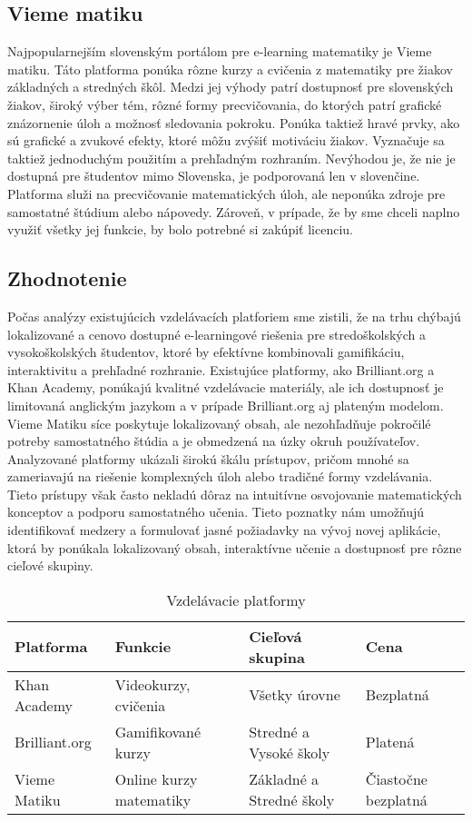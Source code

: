 \subsection{Vieme matiku}
Najpopularnejším slovenským portálom pre e-learning matematiky je Vieme matiku.
Táto platforma ponúka rôzne kurzy a cvičenia z matematiky pre žiakov základných a stredných škôl.
Medzi jej výhody patrí dostupnosť pre slovenských žiakov, široký výber tém, rôzné formy precvičovania,
do ktorých patrí grafické znázornenie úloh a možnosť sledovania pokroku.
Ponúka taktiež hravé prvky, ako sú grafické a zvukové efekty, ktoré môžu zvýšiť motiváciu žiakov.
Vyznačuje sa taktiež jednoduchým použitím a prehľadným rozhraním.
Nevýhodou je, že nie je dostupná pre študentov mimo Slovenska, je podporovaná len v slovenčine.
Platforma služi na precvičovanie matematických úloh, ale neponúka zdroje pre samostatné štúdium alebo nápovedy. 
Zároveň, v prípade, že by sme chceli naplno využiť všetky jej funkcie, by bolo potrebné si zakúpiť licenciu. \cite{viemeto}
\subsection{Zhodnotenie}
Počas analýzy existujúcich vzdelávacích platforiem sme zistili, že na trhu chýbajú lokalizované a cenovo dostupné e-learningové riešenia pre stredoškolských a vysokoškolských študentov, ktoré by efektívne kombinovali gamifikáciu, interaktivitu a prehľadné rozhranie. 
Existujúce platformy, ako Brilliant.org a Khan Academy, ponúkajú kvalitné vzdelávacie materiály, ale ich dostupnosť je limitovaná anglickým jazykom a v prípade Brilliant.org aj plateným modelom. 
Vieme Matiku síce poskytuje lokalizovaný obsah, ale nezohľadňuje pokročilé potreby samostatného štúdia a je obmedzená na úzky okruh používateľov.
Analyzované platformy ukázali širokú škálu prístupov, pričom mnohé sa zameriavajú na riešenie komplexných úloh alebo tradičné formy vzdelávania.
 Tieto prístupy však často nekladú dôraz na intuitívne osvojovanie matematických konceptov a podporu samostatného učenia. 
Tieto poznatky nám umožňujú identifikovať medzery a formulovať jasné požiadavky na vývoj novej aplikácie, ktorá by ponúkala lokalizovaný obsah, interaktívne učenie a dostupnosť pre rôzne cieľové skupiny.
\begin{table}[htbp]
\caption{Vzdelávacie platformy}
\label{vzdelavaciePlatformy}
\begin{tabularx}{\textwidth}{|X|X|X|X|}
\hline
\textbf{Platforma} & \textbf{Funkcie} & \textbf{Cieľová skupina} & \textbf{Cena} \\ \hline
Khan Academy & Videokurzy, cvičenia & Všetky úrovne & Bezplatná \\ \hline
Brilliant.org & Gamifikované kurzy & Stredné a Vysoké školy & Platená \\ \hline
Vieme Matiku & Online kurzy matematiky & Základné a Stredné školy & Čiastočne bezplatná \\ \hline
\end{tabularx}
\end{table}

